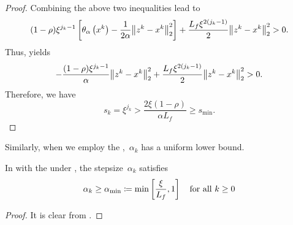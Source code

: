 \documentclass[../../main]{subfiles}
\begin{document}
\begin{proof}
    Combining the above two inequalities lead to
    \begin{equation}
        (1 - \rho) \xi^{j_k - 1} \left[ \theta_\alpha\left(x^k\right) - \frac{1}{2 \alpha} \norm*{z^k - x^k}_2^2 \right] + \frac{L_f \xi^{2 (j_k - 1)}}{2} \norm*{z^k - x^k}_2^2 > 0
    .\end{equation} 
    Thus,  yields
    \begin{equation}
        - \frac{(1 - \rho) \xi^{j_k - 1}}{\alpha} \norm*{z^k - x^k}_2^2 + \frac{L_f \xi^{2 (j_k - 1)}}{2} \norm*{z^k - x^k}_2^2 > 0
    .\end{equation} 
    Therefore, we have
    \begin{equation}
        s_k = \xi^{j_k} > \frac{2 \xi (1 - \rho)}{\alpha L_f} \ge s_{\min}
    .\end{equation}
\end{proof}

Similarly, when we employ the ,~$\alpha_k$ has a uniform lower bound.
\begin{lemma} 
    In  with the  under , the stepsize~$\alpha_k$ satisfies
    \begin{equation}
        \alpha_k \ge \alpha_{\min} \coloneqq \min \left[\frac{\xi}{L_f}, 1\right] \quad \text{for all~$k \ge 0$}
    \end{equation}
\end{lemma}
\begin{proof}
    It is clear from .
\end{proof}
\end{document}

